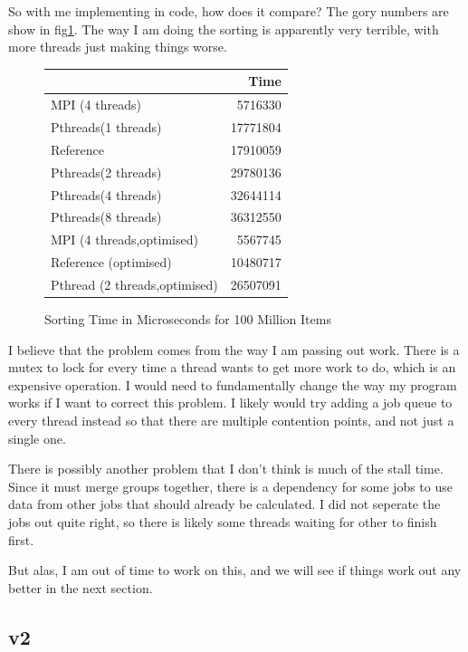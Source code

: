 \documentclass[12pt]{article}
\begin{document}
So with me implementing in code, how does it compare?
The gory numbers are show in fig\ref{sorting_time2}.
The way I am doing the sorting is apparently very terrible, with more threads just making things worse.

\begin{figure} [ht]
	\centering
	\begin{tabular}{|l|r|}
		\hline
		& Time  \\ \hline
		MPI (4 threads)&5716330      \\ \hline
		Pthreads(1 threads)&17771804 \\ \hline
		Reference&17910059           \\ \hline
		Pthreads(2 threads)&29780136 \\ \hline
		Pthreads(4 threads)&32644114 \\ \hline
		Pthreads(8 threads)&36312550 \\ \hline
		\hline
		MPI (4 threads,optimised)&5567745 \\ \hline
		Reference (optimised)&10480717\\ \hline
		Pthread (2 threads,optimised)&26507091 \\ \hline
	\end{tabular}
	\caption{Sorting Time in Microseconds for 100 Million Items}
	\label{sorting_time2}
\end{figure}

I believe that the problem comes from the way I am passing out work.
There is a mutex to lock for every time a thread wants to get more work to do, which is an expensive operation.
I would need to fundamentally change the way my program works if I want to correct this problem.
I likely would try adding a job queue to every thread instead so that there are multiple contention points, and not just a single one.

There is possibly another problem that I don't think is much of the stall time.
Since it must merge groups together, there is a dependency for some jobs to use data from other jobs that should already be calculated.
I did not seperate the jobs out quite right, so there is likely some threads waiting for other to finish first.

But alas, I am out of time to work on this, and we will see if things work out any better in the next section.

\subsection{v2}
\end{document}
